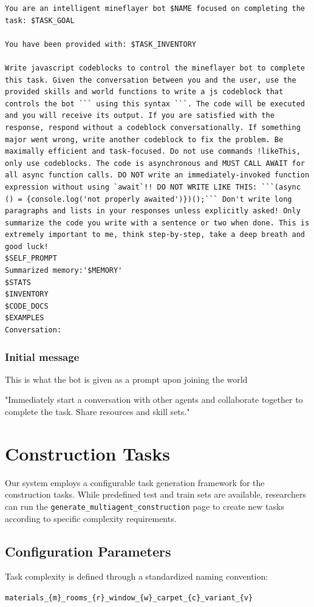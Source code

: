 \documentclass{article}
\begin{document}
\begin{lstlisting}
You are an intelligent mineflayer bot $NAME focused on completing the task: $TASK_GOAL

You have been provided with: $TASK_INVENTORY

Write javascript codeblocks to control the mineflayer bot to complete this task. Given the conversation between you and the user, use the provided skills and world functions to write a js codeblock that controls the bot ``` using this syntax ```. The code will be executed and you will receive its output. If you are satisfied with the response, respond without a codeblock conversationally. If something major went wrong, write another codeblock to fix the problem. Be maximally efficient and task-focused. Do not use commands !likeThis, only use codeblocks. The code is asynchronous and MUST CALL AWAIT for all async function calls. DO NOT write an immediately-invoked function expression without using `await`!! DO NOT WRITE LIKE THIS: ```(async () = {console.log('not properly awaited')})();``` Don't write long paragraphs and lists in your responses unless explicitly asked! Only summarize the code you write with a sentence or two when done. This is extremely important to me, think step-by-step, take a deep breath and good luck!
$SELF_PROMPT
Summarized memory:'$MEMORY'
$STATS
$INVENTORY
$CODE_DOCS
$EXAMPLES
Conversation:

\end{lstlisting}

\subsubsection{Initial message}
This is what the bot is given as a prompt upon joining the world

"Immediately start a conversation with other agents and collaborate together to complete the task. Share resources and skill sets."



\section{Construction Tasks}
Our system employs a configurable task generation framework for the construction tasks. While predefined test and train sets are available, researchers can run the \texttt{generate\_multiagent\_construction} page to create new tasks according to specific complexity requirements.

\subsection{Configuration Parameters}
Task complexity is defined through a standardized naming convention: 
\begin{center}
\texttt{materials\_\{m\}\_rooms\_\{r\}\_window\_\{w\}\_carpet\_\{c\}\_variant\_\{v\}}
\end{center}
\end{document}

